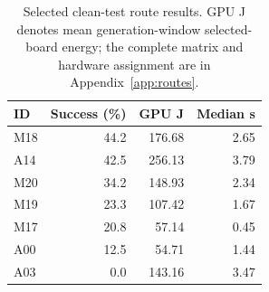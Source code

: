 \begin{table}[t]
\caption{Selected clean-test route results. GPU J denotes mean generation-window selected-board energy; the complete matrix and hardware assignment are in Appendix~\ref{app:routes}.}
\label{tab:route-highlights}
\centering
\scriptsize
\begin{tabular}{@{}lrrr@{}}
\toprule
ID & Success (\%) & GPU J & Median s \\
\midrule
M18 & 44.2 & 176.68 & 2.65 \\
A14 & 42.5 & 256.13 & 3.79 \\
M20 & 34.2 & 148.93 & 2.34 \\
M19 & 23.3 & 107.42 & 1.67 \\
M17 & 20.8 & 57.14 & 0.45 \\
A00 & 12.5 & 54.71 & 1.44 \\
A03 & 0.0 & 143.16 & 3.47 \\
\bottomrule
\end{tabular}
\end{table}
